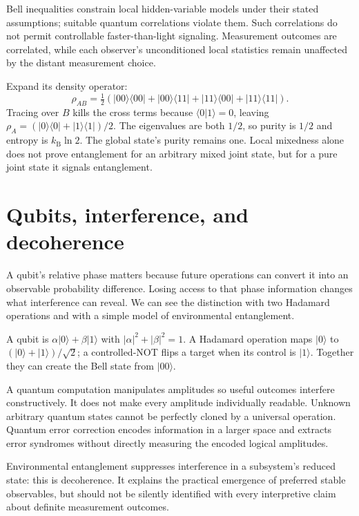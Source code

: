 \documentclass[11pt,oneside]{book}
\newcommand{\ket}[1]{\lvert #1\rangle}
\newcommand{\bra}[1]{\langle #1\rvert}
\newcommand{\kb}{k_{\mathrm B}}
\theoremstyle{reviewstyle}
\begin{document}
Bell inequalities constrain local hidden-variable models under their stated assumptions; suitable quantum correlations violate them. Such correlations do not permit controllable faster-than-light signaling. Measurement outcomes are correlated, while each observer's unconditioned local statistics remain unaffected by the distant measurement choice.

Expand its density operator:
\begin{equation}
\rho_{AB}=\tfrac12(\ket{00}\bra{00}+\ket{00}\bra{11}
+\ket{11}\bra{00}+\ket{11}\bra{11}).
\end{equation}
Tracing over $B$ kills the cross terms because $\langle0|1\rangle=0$, leaving $\rho_A=(\ket0\bra0+\ket1\bra1)/2$. The eigenvalues are both $1/2$, so purity is $1/2$ and entropy is $\kb\ln2$. The global state's purity remains one. Local mixedness alone does not prove entanglement for an arbitrary mixed joint state, but for a pure joint state it signals entanglement.

\section{Qubits, interference, and decoherence}
A qubit's relative phase matters because future operations can convert it into an observable probability difference. Losing access to that phase information changes what interference can reveal. We can see the distinction with two Hadamard operations and with a simple model of environmental entanglement.

A qubit is $\alpha\ket0+\beta\ket1$ with $|\alpha|^2+|\beta|^2=1$. A Hadamard operation maps $\ket0$ to $(\ket0+\ket1)/\sqrt2$; a controlled-NOT flips a target when its control is $\ket1$. Together they can create the Bell state from $\ket{00}$.

A quantum computation manipulates amplitudes so useful outcomes interfere constructively. It does not make every amplitude individually readable. Unknown arbitrary quantum states cannot be perfectly cloned by a universal operation. Quantum error correction encodes information in a larger space and extracts error syndromes without directly measuring the encoded logical amplitudes.

Environmental entanglement suppresses interference in a subsystem's reduced state: this is decoherence. It explains the practical emergence of preferred stable observables, but should not be silently identified with every interpretive claim about definite measurement outcomes.
\end{document}
